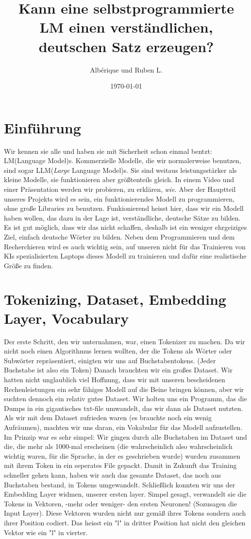 \documentclass[12pt, letterpaper]{article}
\title{Kann eine selbstprogrammierte LM einen verständlichen, deutschen Satz erzeugen?}
\author{Albérique und Ruben L.}
\date{\today}
\begin{document}
\maketitle
\newpage
\section{Einführung}
Wir kennen sie alle und haben sie mit Sicherheit schon einmal bentzt: LM(Language Model)s. Kommerzielle Modelle, die wir normalerweise benutzen, sind sogar LLM(\textit{Large} Language Model)s. Sie sind weitaus leistungsstärker als kleine Modelle, sie funktionieren aber größtenteils gleich. In einem Video und einer Präsentation werden wir probieren, zu erklären, \textit{wie}. Aber der Hauptteil unseres Projekts wird es sein, ein funktionierendes Modell zu programmieren, ohne große Libraries zu benutzen. Funkionierend heisst hier, dass wir ein Modell haben wollen, das dazu in der Lage ist, verständliche, deutsche Sätze zu bilden. Es ist gut möglich, dass wir das nicht schaffen, deshalb ist ein weniger ehrgeiziges Ziel, einfach deutsche Wörter zu bilden. Neben dem Programmieren und dem Recherchieren wird es auch wichtig sein, auf unseren nicht für das Trainieren von KIs spezialisierten Laptops dieses Modell zu trainieren und dafür eine realistische Größe zu finden.
\section{Tokenizing, Dataset, Embedding Layer, Vocabulary}
Der erste Schritt, den wir unternahmen, war, einen Tokenizer zu machen. Da wir nicht noch einen Algorithmus lernen wollten, der die Tokens als Wörter oder Subwörter repräsentiert, einigten wir uns auf Buchstabentokens. (Jeder Buchstabe ist also ein Token)
Danach brauchten wir ein großes Dataset. Wir hatten nicht unglaublich viel Hoffnung, dass wir mit unseren bescheidenen Rechenleistungen ein sehr fähiges Modell auf die Beine bringen können, aber wir suchten dennoch ein relativ gutes Dataset. Wir holten uns ein Programm, das die Dumps in ein gigantisches txt-file umwandelt, das wir dann als Dataset nutzten.
Als wir mit dem Dataset zufrieden waren (es brauchte noch ein wenig Aufräumen), machten wir uns daran, ein Vokabular für das Modell aufzustellen. Im Prinzip war es sehr simpel: Wir gingen durch alle Buchstaben im Dataset und die, die mehr als 1000-mal erscheinen (die wahrscheinlich also wahrscheinlich wichtig waren, für die Sprache, in der es geschrieben wurde) wurden zusammen mit ihrem Token in ein seperates File gepackt.
Damit in Zukunft das Training schneller gehen kann, haben wir auch das gesamte Dataset, das noch aus Buchstaben bestand, in Tokens umgewandelt. 
Schließlich konnten wir uns der Embedding Layer widmen, unserer ersten layer. Simpel gesagt, verwandelt sie die Tokens in Vektoren, -mehr oder weniger- den ersten Neuronen! (Sozusagen die Input Layer). Diese Vektoren wurden nicht nur gemäß ihres Tokens sondern auch ihrer Position codiert. Das heisst ein "l" in dritter Position hat nicht den gleichen Vektor wie ein "l" in vierter. 
\end{document}
